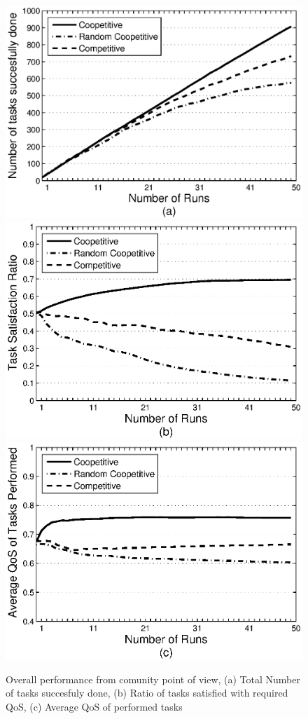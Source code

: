 \documentclass[runningheads,a4paper]{llncs}
\begin{document}
\begin{figure}%
\centering
\includegraphics[scale=0.275]{graphtaskdone.eps}
\includegraphics[scale=0.275]{graphtasksatisfaction.eps}
\includegraphics[scale=0.275]{graphavgqostask.eps}
\caption{Overall performance from comunity point of view, (a) Total Number of tasks succesfuly done, (b) Ratio of tasks satisfied with required QoS, (c) Average QoS of performed tasks} \label{graph_task}
\end{figure}
\end{document}
